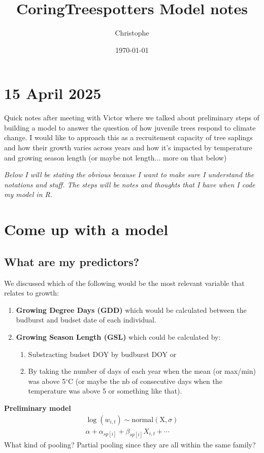 \documentclass[a4paper,12pt]{article}
\title{CoringTreespotters Model notes}
\author{Christophe}
\date{\today}
\begin{document}
\maketitle

\section*{15 April 2025}
Quick notes after meeting with Victor where we talked about preliminary steps of building a model to answer the question of how juvenile trees respond to climate change. I would like to approach this as a recruitement capacity of tree saplings and how their growth varies across years and how it's impacted by temperature and growing season length (or maybe not length... more on that below)

\newpage
\textit{Below I will be stating the obvious because I want to make sure I understand the notations and stuff. The steps will be notes and thoughts that I have when I code my model in R.}

\section{Come up with a model}

\subsection*{What are my predictors?}
We discussed which of the following would be the most relevant variable that relates to growth:
\begin{enumerate}
	\item \textbf{Growing Degree Days (GDD)} which would be calculated between the budburst and budset date of each individual. 
	\item \textbf{Growing Season Length (GSL)} which could be calculated by:
	\begin{enumerate}
		\item Substracting budset DOY by budburst DOY or 
		\item By taking the number of days of each year when the mean (or max/min) was above 5$^{\circ}$C (or maybe the nb of consecutive days when the temperature was above 5 or something like that).
	\end{enumerate}
\end{enumerate}

\par
\textbf{Preliminary model} \\ 
\begin{align}
	\log (w_{i,t}) \sim \text{normal}(\text{X}, \sigma) \\
	\alpha + \alpha_{sp[i]} + \beta_{sp[i]} X_{i,t} + \cdots
\end{align} 
What kind of pooling? Partial pooling since they are all within the same family?\\
\end{document}
